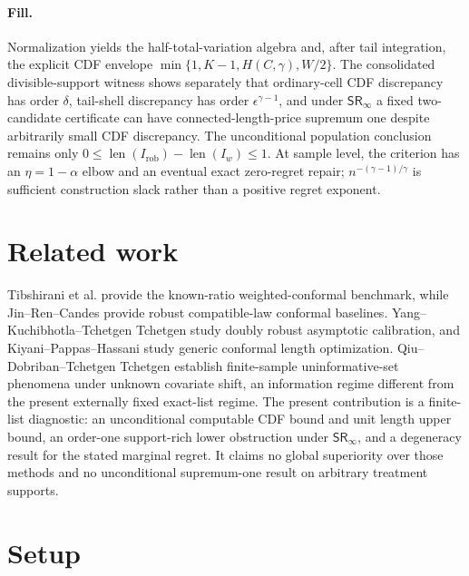 \documentclass{article}
\begin{document}
\paragraph{Fill.} Normalization yields the half-total-variation algebra and, after tail integration, the explicit CDF envelope \(\min\{1,K-1,H(C,\gamma),W/2\}\). The consolidated divisible-support witness shows separately that ordinary-cell CDF discrepancy has order \(\delta\), tail-shell discrepancy has order \(\epsilon^{\gamma-1}\), and under \(\mathsf{SR}_\infty\) a fixed two-candidate certificate can have connected-length-price supremum one despite arbitrarily small CDF discrepancy. The unconditional population conclusion remains only \(0\le\operatorname{len}(I_{\mathrm{rob}})-\operatorname{len}(I_w)\le1\). At sample level, the criterion has an \(\eta=1-\alpha\) elbow and an eventual exact zero-regret repair; \(n^{-(\gamma-1)/\gamma}\) is sufficient construction slack rather than a positive regret exponent.

\section{Related work}

Tibshirani et al. provide the known-ratio weighted-conformal benchmark, while Jin--Ren--Candes provide robust compatible-law conformal baselines. Yang--Kuchibhotla--Tchetgen Tchetgen study doubly robust asymptotic calibration, and Kiyani--Pappas--Hassani study generic conformal length optimization. Qiu--Dobriban--Tchetgen Tchetgen establish finite-sample uninformative-set phenomena under unknown covariate shift, an information regime different from the present externally fixed exact-list regime. The present contribution is a finite-list diagnostic: an unconditional computable CDF bound and unit length upper bound, an order-one support-rich lower obstruction under \(\mathsf{SR}_\infty\), and a degeneracy result for the stated marginal regret. It claims no global superiority over those methods and no unconditional supremum-one result on arbitrary treatment supports.

\section{Setup}
\end{document}

